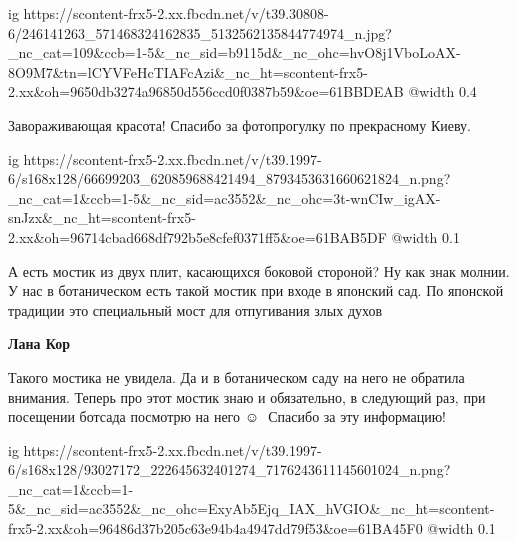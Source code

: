  
 
 
 
 

\ifcmt
  ig https://scontent-frx5-2.xx.fbcdn.net/v/t39.30808-6/246141263_571468324162835_5132562135844774974_n.jpg?_nc_cat=109&ccb=1-5&_nc_sid=b9115d&_nc_ohc=hvO8j1VboLoAX-8O9M7&tn=lCYVFeHcTIAFcAzi&_nc_ht=scontent-frx5-2.xx&oh=9650db3274a96850d556ccd0f0387b59&oe=61BBDEAB
  @width 0.4
\fi



Завораживающая красота! Спасибо за фотопрогулку по прекрасному Киеву.

\ifcmt
  ig https://scontent-frx5-2.xx.fbcdn.net/v/t39.1997-6/s168x128/66699203_620859688421494_8793453631660621824_n.png?_nc_cat=1&ccb=1-5&_nc_sid=ac3552&_nc_ohc=3t-wnCIw_igAX-snJzx&_nc_ht=scontent-frx5-2.xx&oh=96714cbad668df792b5e8cfef0371ff5&oe=61BAB5DF
  @width 0.1
\fi


А есть мостик из двух плит, касающихся боковой стороной? Ну как знак молнии. У
нас в ботаническом есть такой мостик при входе в японский сад. По японской
традиции это специальный мост для отпугивания злых духов

\textbf{Лана Кор} 

Такого мостика не увидела.
Да и в ботаническом саду на него не обратила внимания.
Теперь про этот мостик знаю и обязательно, в следующий раз, при посещении ботсада посмотрю на него ☺ ️ 
Спасибо за эту информацию!


\ifcmt
  ig https://scontent-frx5-2.xx.fbcdn.net/v/t39.1997-6/s168x128/93027172_222645632401274_7176243611145601024_n.png?_nc_cat=1&ccb=1-5&_nc_sid=ac3552&_nc_ohc=ExyAb5Ejq_IAX_hVGIO&_nc_ht=scontent-frx5-2.xx&oh=96486d37b205c63e94b4a4947dd79f53&oe=61BA45F0
  @width 0.1
\fi
